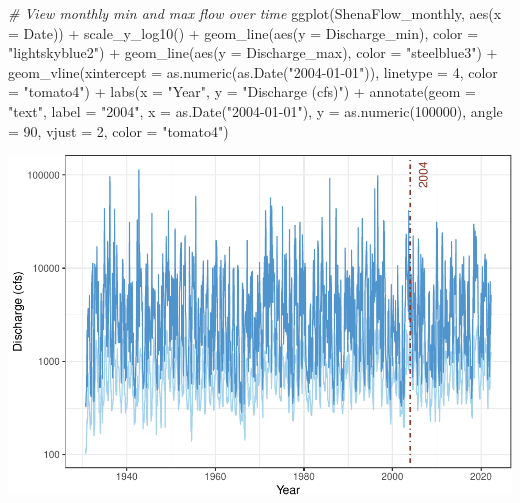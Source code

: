 \documentclass[
  12pt,
]{article}
\newenvironment{Shaded}{\begin{snugshade}}{\end{snugshade}}
\newcommand{\AttributeTok}[1]{\textcolor[rgb]{0.77,0.63,0.00}{#1}}
\newcommand{\CommentTok}[1]{\textcolor[rgb]{0.56,0.35,0.01}{\textit{#1}}}
\newcommand{\DecValTok}[1]{\textcolor[rgb]{0.00,0.00,0.81}{#1}}
\newcommand{\FunctionTok}[1]{\textcolor[rgb]{0.00,0.00,0.00}{#1}}
\newcommand{\NormalTok}[1]{#1}
\newcommand{\SpecialCharTok}[1]{\textcolor[rgb]{0.00,0.00,0.00}{#1}}
\newcommand{\StringTok}[1]{\textcolor[rgb]{0.31,0.60,0.02}{#1}}
\begin{document}
\begin{Shaded}
\begin{Highlighting}[]
\CommentTok{\# View monthly min and max flow over time}
\FunctionTok{ggplot}\NormalTok{(ShenaFlow\_monthly, }\FunctionTok{aes}\NormalTok{(}\AttributeTok{x =}\NormalTok{ Date)) }\SpecialCharTok{+}
  \FunctionTok{scale\_y\_log10}\NormalTok{() }\SpecialCharTok{+}
  \FunctionTok{geom\_line}\NormalTok{(}\FunctionTok{aes}\NormalTok{(}\AttributeTok{y =}\NormalTok{ Discharge\_min), }\AttributeTok{color =} \StringTok{"lightskyblue2"}\NormalTok{) }\SpecialCharTok{+}
  \FunctionTok{geom\_line}\NormalTok{(}\FunctionTok{aes}\NormalTok{(}\AttributeTok{y =}\NormalTok{ Discharge\_max), }\AttributeTok{color =} \StringTok{"steelblue3"}\NormalTok{) }\SpecialCharTok{+}
  \FunctionTok{geom\_vline}\NormalTok{(}\AttributeTok{xintercept =} \FunctionTok{as.numeric}\NormalTok{(}\FunctionTok{as.Date}\NormalTok{(}\StringTok{"2004{-}01{-}01"}\NormalTok{)), }
             \AttributeTok{linetype =} \DecValTok{4}\NormalTok{, }\AttributeTok{color =} \StringTok{"tomato4"}\NormalTok{) }\SpecialCharTok{+}
  \FunctionTok{labs}\NormalTok{(}\AttributeTok{x =} \StringTok{"Year"}\NormalTok{, }\AttributeTok{y =} \StringTok{"Discharge (cfs)"}\NormalTok{) }\SpecialCharTok{+}
  \FunctionTok{annotate}\NormalTok{(}\AttributeTok{geom =} \StringTok{"text"}\NormalTok{,}
           \AttributeTok{label =} \StringTok{"2004"}\NormalTok{,}
           \AttributeTok{x =} \FunctionTok{as.Date}\NormalTok{(}\StringTok{"2004{-}01{-}01"}\NormalTok{),}
           \AttributeTok{y =} \FunctionTok{as.numeric}\NormalTok{(}\DecValTok{100000}\NormalTok{),}
           \AttributeTok{angle =} \DecValTok{90}\NormalTok{, }
           \AttributeTok{vjust =} \DecValTok{2}\NormalTok{,}
           \AttributeTok{color =} \StringTok{"tomato4"}\NormalTok{)}
\end{Highlighting}
\end{Shaded}

\includegraphics{Project_Template_files/figure-latex/Flow.analysis-1.pdf}
\end{document}
